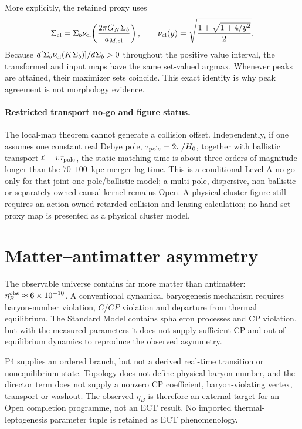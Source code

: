 \documentclass[11pt,a4paper]{article}
\begin{document}
More explicitly, the retained proxy uses
\begin{equation}
 \Sigma_{\rm cl}=\Sigma_b\nu_{\rm cl}
 \!\left(\frac{2\pi G_N\Sigma_b}{a_{M,\rm cl}}\right),
 \qquad
 \nu_{\rm cl}(y)=
 \sqrt{\frac{1+\sqrt{1+4/y^2}}{2}}.
 \label{eq:pop_cluster_hrc0_proxy}
\end{equation}
Because $d[\Sigma_b\nu_{\rm cl}(K\Sigma_b)]/d\Sigma_b>0$ throughout the
positive value interval, the transformed and input maps have the same
set-valued argmax.  Whenever peaks are attained, their maximizer sets
coincide.  This exact identity is why peak agreement is not morphology
evidence.

\paragraph{Restricted transport no-go and figure status.}
The local-map theorem cannot generate a collision offset.  Independently, if
one assumes one constant real Debye pole,
$\tau_{\rm pole}=2\pi/H_0$, together with ballistic transport
$\ell=v\tau_{\rm pole}$, the static matching time is about three orders of
magnitude longer than the $70$--$100$~kpc merger-lag time.  This is a
conditional Level-A no-go only for that joint one-pole/ballistic model; a
multi-pole, dispersive, non-ballistic or separately owned causal kernel
remains Open.  A physical cluster figure still requires an action-owned
retarded collision and lensing calculation; no hand-set proxy map is
presented as a physical cluster model.

\section{Matter--antimatter asymmetry}

The observable universe contains far more matter than antimatter:
$\eta_B^{\rm obs}\approx6\times10^{-10}$.  A conventional dynamical
baryogenesis mechanism requires baryon-number violation, $C$/$CP$ violation
and departure from thermal equilibrium.  The Standard Model contains
sphaleron processes and CP violation, but with the measured parameters it
does not supply sufficient CP and out-of-equilibrium dynamics to reproduce
the observed asymmetry.

P4 supplies an ordered branch, but not a derived real-time transition or
nonequilibrium state.  Topology does not define physical baryon number, and
the director term does not supply a nonzero CP coefficient, baryon-violating
vertex, transport or washout.  The observed $\eta_B$ is therefore an external
target for an Open completion programme, not an ECT result.  No imported
thermal-leptogenesis parameter tuple is retained as ECT phenomenology.
\end{document}
